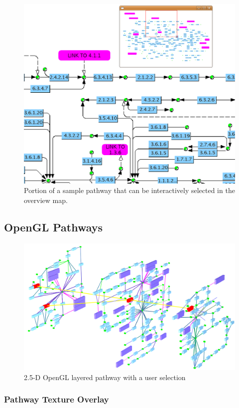 \begin{figure}[ht]
  \centering
    \includegraphics[width=0.5\linewidth]{gfx/overview_method}
  \caption{Portion of a sample pathway that can be interactively selected in the overview map.}
  \label{fig:overview_method}
\end{figure}

\subsection{OpenGL Pathways}

\begin{figure}
  \centering
    \includegraphics[width=0.7\linewidth]{gfx/opengl_layered_pathway_without_texture}
  \caption{2.5-D OpenGL layered pathway with a user selection}
  \label{fig:opengl_layered_pathway_without_texture}
\end{figure}

\subsubsection{Pathway Texture Overlay}

